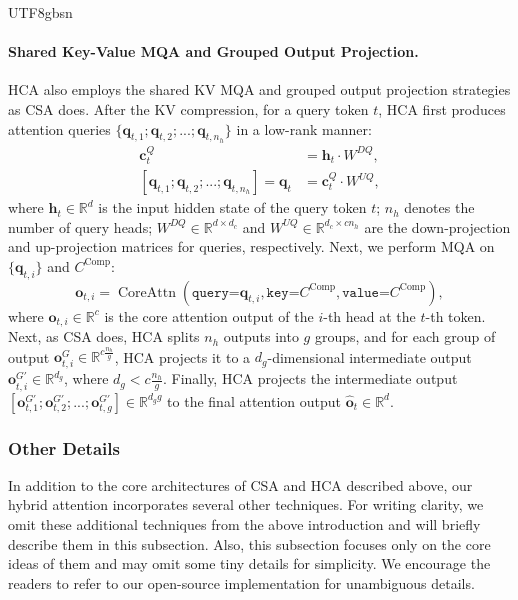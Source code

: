 \documentclass[11pt, a4paper, logo, copyright, nonumbering]{deepseek}
\newcommand{\hca}{HCA}
\newcommand{\csa}{CSA}
\begin{document}
\begin{CJK*}{UTF8}{gbsn}
\paragraph{Shared Key-Value MQA and Grouped Output Projection.}
\hca{} also employs the shared KV MQA and grouped output projection strategies as \csa{} does. 
After the KV compression, for a query token $t$, \hca{} first produces attention queries $\{\mathbf{q}_{t, 1};\mathbf{q}_{t, 2};...;\mathbf{q}_{t, n_{h}}\}$ in a low-rank manner: 
\begin{align}
    \mathbf{c}_{t}^{Q} &= \mathbf{h}_{t} \cdot W^{DQ}, \\
    [\mathbf{q}_{t, 1};\mathbf{q}_{t, 2};...;\mathbf{q}_{t, n_{h}}] = \mathbf{q}_{t} &= \mathbf{c}_{t}^{Q} \cdot W^{UQ},
\end{align}
where $\mathbf{h}_{t} \in \mathbb{R}^{d}$ is the input hidden state of the query token $t$; $n_{h}$ denotes the number of query heads; $W^{DQ} \in \mathbb{R}^{d \times d_c}$ and $W^{UQ} \in \mathbb{R}^{d_c \times c n_h}$ are the down-projection and up-projection matrices for queries, respectively. 
Next, we perform MQA on $\{\mathbf{q}_{t, i}\}$ and $C^{\text{Comp}}$: 
\begin{equation}
    \mathbf{o}_{t,i} = \operatorname{CoreAttn}\left( \texttt{query=}\mathbf{q}_{t,i}, \texttt{key=}C^{\text{Comp}}, \texttt{value=}C^{\text{Comp}} \right),
\end{equation}
where $\mathbf{o}_{t,i} \in \mathbb{R}^{c}$ is the core attention output of the $i$-th head at the $t$-th token. 
Next, as \csa{} does, \hca{} splits $n_h$ outputs into $g$ groups, and for each group of output $\mathbf{o}^G_{t, i} \in \mathbb{R}^{c \frac{n_h}{g}}$, \hca{} projects it to a $d_g$-dimensional intermediate output $\mathbf{o}^{G'}_{t, i} \in \mathbb{R}^{d_g}$, where $d_g < c \frac{n_h}{g}$. 
Finally, \hca{} projects the intermediate output $[\mathbf{o}^{G'}_{t, 1}; \mathbf{o}^{G'}_{t, 2}; ...; \mathbf{o}^{G'}_{t, g}] \in \mathbb{R}^{d_gg}$ to the final attention output $\mathbf{\hat{o}}_{t} \in \mathbb{R}^{d}$. 

\subsubsection{Other Details}

In addition to the core architectures of \csa{} and \hca{} described above, our hybrid attention incorporates several other techniques. 
For writing clarity, we omit these additional techniques from the above introduction and will briefly describe them in this subsection.
Also, this subsection focuses only on the core ideas of them and may omit some tiny details for simplicity. 
We encourage the readers to refer to our open-source implementation for unambiguous details.


\end{CJK*}
\end{document}
